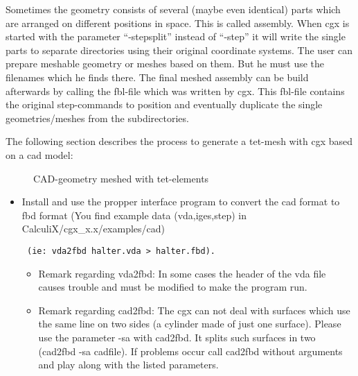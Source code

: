 \documentclass{article}
\begin{document}
\begin{appendix}
\begin{itemize}
Sometimes the geometry consists of several (maybe even identical) parts which are arranged on different positions in space. This is called assembly. When cgx is started with the parameter ``-stepsplit'' instead of ``-step'' it will write the single parts to separate directories using their original coordinate systems. The user can prepare meshable geometry or meshes based on them. But he must use the filenames which he finds there. The final meshed assembly can be build afterwards by calling the fbl-file which was written by cgx. This fbl-file contains the original step-commands to position and eventually duplicate the single geometries/meshes from the subdirectories.   
\end{itemize}

The following section describes the process to generate a tet-mesh with cgx based on a cad model:


\begin{figure}[h]
\caption{\label{halter} CAD-geometry meshed with tet-elements }
\end{figure}

\begin{itemize}

\item Install and use the propper interface program to convert the cad format to fbd format (You find example data (vda,iges,step) in CalculiX/cgx\_x.x/examples/cad)\begin{verbatim} (ie: vda2fbd halter.vda > halter.fbd). \end{verbatim}
\begin{itemize}
\item Remark regarding vda2fbd: In some cases the header of the vda file causes trouble and must be modified to make the program run.
\item Remark regarding cad2fbd: The cgx can not deal with surfaces which use the same line on two sides (a cylinder made of just one surface). Please use the parameter -sa with cad2fbd. It splits such surfaces in two (cad2fbd -sa cadfile). If problems occur call cad2fbd without arguments and play along with the listed parameters.
\end{itemize}


\end{itemize}
\end{appendix}
\end{document}
